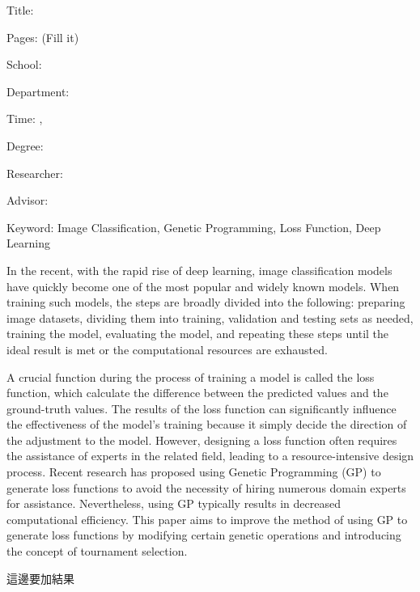 \begin{EnAbstract}
    \begin{EnAbstractItems}
        \noindent \text Title: \eTitle

        \noindent \text Pages: (Fill it)

        \noindent \text School: \univEname

        \noindent \text Department: \deptEname

        \noindent \text Time: \eMonth, \eYear

        \noindent \text Degree: \degreeEname

        \noindent \text Researcher: \myEname

        \noindent \text Advisor: \advisorEname

        \noindent \text Keyword: Image Classification, Genetic Programming, Loss Function, Deep Learning

    \end{EnAbstractItems}

    \begin{EnAbstractDescription}
        In the recent, with the rapid rise of deep learning, image classification models have quickly become one of the most popular and widely known models. When training such models, the steps are broadly divided into the following: preparing image datasets, dividing them into training, validation and testing sets as needed, training the model, evaluating the model, and repeating these steps until the ideal result is met or the computational resources are exhausted.

        A crucial function during the process of training a model is called the loss function, which calculate the difference between the predicted values and the ground-truth values. The results of the loss function can significantly influence the effectiveness of the model's training because it simply decide the direction of the adjustment to the model. However, designing a loss function often requires the assistance of experts in the related field, leading to a resource-intensive design process. Recent research has proposed using Genetic Programming (GP) to generate loss functions to avoid the necessity of hiring numerous domain experts for assistance. Nevertheless, using GP typically results in decreased computational efficiency. This paper aims to improve the method of using GP to generate loss functions by modifying certain genetic operations and introducing the concept of tournament selection.

        這邊要加結果
    \end{EnAbstractDescription}

\end{EnAbstract}

